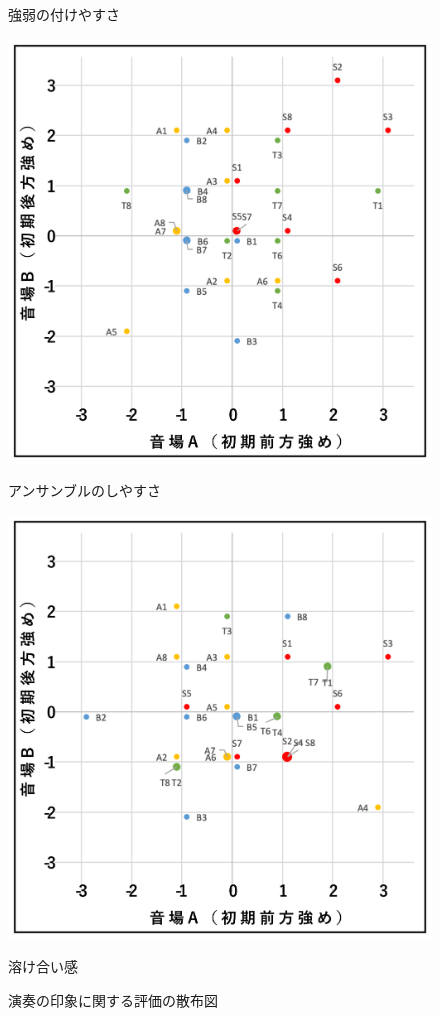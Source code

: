 \documentclass[11pt,a4j]{jreport}
\begin{document}
\begin{figure}[H]
\begin{minipage}{0.5\linewidth}
    \caption*{強弱の付けやすさ}
  \end{minipage}
  \begin{minipage}{.5\linewidth}
    \centering
    \includegraphics[width=.9\linewidth]{images/subjectiveExp/scat_early_10ensemble.png}
    \caption*{アンサンブルのしやすさ}
  \end{minipage}%
  \begin{minipage}{.5\linewidth}
    \centering
    \includegraphics[width=.9\linewidth]{images/subjectiveExp/scat_early_11notConflict.png}
    \caption*{溶け合い感}
  \end{minipage}

  \caption{演奏の印象に関する評価の散布図}
  \label{fig:演奏の印象に関する評価の散布図}
\end{figure}
\end{document}
